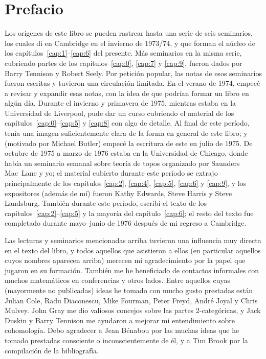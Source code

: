 \chapter*{Prefacio}
\label{chap:prefacio}

Los orígenes de este libro se pueden rastrear hasta una serie de seis
seminarios, los cuales di en Cambridge en el invierno de 1973/74, y que forman
el núcleo de los capítulos~\ref{cap:1}--\ref{cap:6} del presente. Más seminarios
en la misma serie, cubriendo partes de los capítulos~\ref{cap:0}, \ref{cap:7} y
\ref{cap:9}, fueron dados por Barry Tennison y Robert Seely. Por petición
popular, las notas de esos seminarios fueron escritas y tuvieron una circulación
limitada. En el verano de 1974, empecé a revisar y expandir esas notas, con la
idea de que podrían formar un libro en algún día. Durante el invierno y
primavera de 1975, mientras estaba en la Universidad de Liverpool, pude dar un
curso cubriendo el material de los capítulos~\ref{cap:0}--\ref{cap:5} y
\ref{cap:8} con algo de detalle. Al final de este período, tenía una imagen
suficientemente clara de la forma en general de este libro; y (motivado por
Michael Butler) empecé la escritura de este en julio de 1975. De octubre de 1975
a marzo de 1976 estaba en la Universidad de Chicago, donde había un seminario
semanal sobre teoría de topos organizado por Saunders Mac~Lane y yo; el material
cubierto durante este período se extrajo principalmente de los capítulos
\ref{cap:2}, \ref{cap:4}, \ref{cap:5}, \ref{cap:6} y \ref{cap:9}, y los
expositores (además de mí) fueron Kathy Edwards, Steve Harris y Steve Landsburg.
También durante este período, escribí el texto de los
capítulos~\ref{cap:2}--\ref{cap:5} y la mayoría del capítulo~\ref{cap:6}; el
resto del texto fue completado durante mayo--junio de 1976 después de mi regreso
a Cambridge.

Las lecturas y seminarios mencionadas arriba tuvieron una influencia muy directa
en el texto del libro, y todos aquellos que asistieron a ellos (en particular
aquellos cuyos nombres aparecen arriba) merecen mi agradecimiento por la papel
que jugaron en su formación. También me he beneficiado de contactos informales
con muchos matemáticos en conferencias y otros lados. Entre aquellos cuyas
(mayormente no publicadas) ideas he tomado con mucho gusto prestadas están
Julian Cole, Radu Diaconescu, Mike Fourman, Peter Freyd, André Joyal y Chris
Mulvey. John Gray me dio valiosos concejos sobre las partes \(2\)-categóricas, y
Jack Duskin y Barry Tennison me ayudaron a mejorar mi entendimiento sobre
cohomología. Debo agradecer a Jean Bénabou por las muchas ideas que he tomado
prestadas consciente o inconscientemente de él, y  a Tim Brook por la
compilación de la bibliografía.

